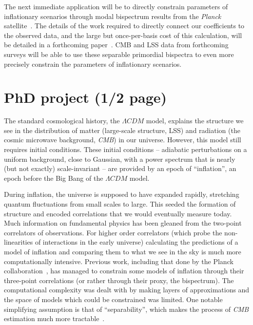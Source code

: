 The next immediate application will be to directly constrain parameters of
inflationary scenarios through modal bispectrum results from the \textit{Planck} satellite~\cite{Planck_NG_2018}.
The details of the work required to directly connect our coefficients to the observed data,
and the large but once-per-basis cost of this calculation, will be detailed in
a forthcoming paper~\cite{Sohn_2020}.
CMB and LSS data from forthcoming surveys will be able to use
these separable primordial bispectra to even more precisely constrain the
parameters of inflationary scenarios.

\section{PhD project (1/2 page)}
The standard cosmological history, the $\Lambda CDM$ model, explains the structure we see in the distribution of matter (large-scale structure, LSS) and radiation (the cosmic microwave background, \textit{CMB}) in our universe. However, this model still requires initial conditions. These initial conditions – adiabatic perturbations on a uniform background, close to Gaussian, with a power spectrum that is nearly (but not exactly) scale-invariant – are provided by an epoch of “inflation”, an epoch before the Big Bang of the $\Lambda CDM$ model. 

During inflation, the universe is supposed to have expanded rapidly, stretching quantum fluctuations from small scales to large. This seeded the formation of structure and encoded correlations that we would eventually measure today.
Much information on fundamental physics has been gleaned from the two-point correlators of observations. For higher order correlators (which probe the non-linearities of interactions in the early universe) calculating the predictions of a model of inflation and comparing them to what we see in the sky is much more computationally intensive. Previous work, including that done by the Planck collaboration~\cite{Planck_NG_2018}, has managed to constrain some models of inflation through their three-point correlations (or rather through their proxy, the bispectrum).
The computational complexity was dealt with by making layers of approximations and the space
of models which could be constrained was limited.
One notable simplifying assumption is that of “separability”, which makes the process of \textit{CMB} estimation much more tractable~\cite{Komatsu_2005}.


